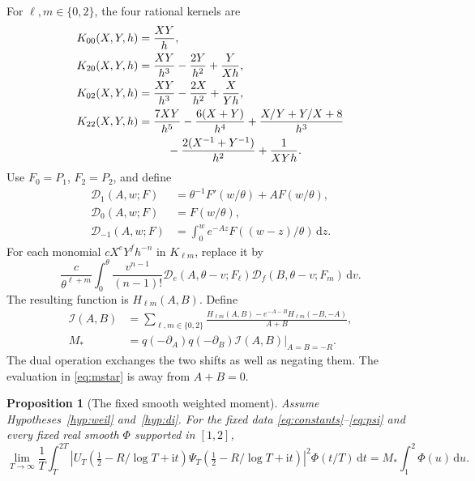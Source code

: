 \documentclass[11pt]{article}
\newtheorem{proposition}[theorem]{Proposition}
\theoremstyle{definition}
\newcommand{\ii}{\mathrm i}
\newcommand{\dd}{\,\mathrm d}
\newcommand{\Qop}{q(-\partial_A)q(-\partial_B)}
\begin{document}
For \(\ell,m\in\{0,2\}\), the four rational kernels are
\begin{align}
 K_{00}(X,Y,h)&=\frac{XY}{h},\notag\\
 K_{20}(X,Y,h)&=\frac{XY}{h^3}-\frac{2Y}{h^2}+\frac{Y}{Xh},\notag\\
 K_{02}(X,Y,h)&=\frac{XY}{h^3}-\frac{2X}{h^2}+\frac{X}{Yh},\notag\\
 K_{22}(X,Y,h)&=\frac{7XY}{h^5}-\frac{6(X+Y)}{h^4}
 +\frac{X/Y+Y/X+8}{h^3}\notag\\
 &\hspace{9mm}-\frac{2(X^{-1}+Y^{-1})}{h^2}+\frac1{XYh}.
 \label{eq:kernels}
\end{align}
Use \(F_0=P_1\), \(F_2=P_2\), and define
\begin{align*}
 \mathcal D_1(A,w;F)&=\theta^{-1}F'(w/\theta)+AF(w/\theta),\\
 \mathcal D_0(A,w;F)&=F(w/\theta),\\
 \mathcal D_{-1}(A,w;F)&=\int_0^w e^{-Az}F((w-z)/\theta)\dd z.
\end{align*}
For each monomial \(cX^eY^fh^{-n}\) in \(K_{\ell m}\), replace it by
\[
 \frac{c}{\theta^{\ell+m}}\int_0^\theta
 \frac{v^{n-1}}{(n-1)!}
 \mathcal D_e(A,\theta-v;F_\ell)
 \mathcal D_f(B,\theta-v;F_m)\dd v.
\]
The resulting function is \(H_{\ell m}(A,B)\). Define
\begin{align}
 \mathcal I(A,B)
 &=\sum_{\ell,m\in\{0,2\}}
 \frac{H_{\ell m}(A,B)-e^{-A-B}H_{\ell m}(-B,-A)}{A+B},
 \label{eq:functional}\\
 M_*&=\left.\Qop\mathcal I(A,B)\right|_{A=B=-R}.
 \label{eq:mstar}
\end{align}
The dual operation exchanges the two shifts as well as negating them.
The evaluation in \eqref{eq:mstar} is away from \(A+B=0\).

\begin{proposition}[The fixed smooth weighted moment]\label{prop:mainterm}
Assume Hypotheses~\ref{hyp:weil} and~\ref{hyp:di}. For the fixed data
\eqref{eq:constants}--\eqref{eq:psi} and every fixed real smooth
\(\Phi\) supported in \([1,2]\),
\begin{equation}\label{eq:weighted-limit}
 \lim_{T\to\infty}\frac1T
 \int_T^{2T}
 |U_T(\tfrac12-R/\log T+\ii t)
   \Psi_T(\tfrac12-R/\log T+\ii t)|^2\Phi(t/T)\dd t
 =M_*\int_1^2\Phi(u)\dd u .
\end{equation}
\end{proposition}
\end{document}
